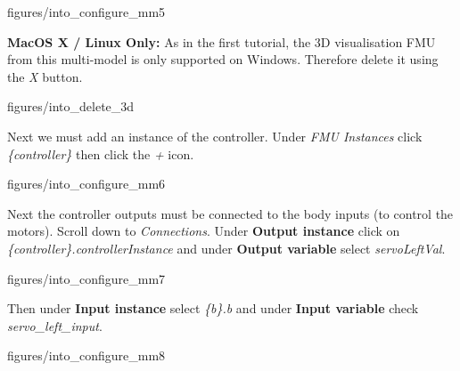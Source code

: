 \documentclass[11pt,a4paper]{../tutorial}
\begin{document}
\begin{instructions}
    \begin{annotation}[width=0.8\linewidth]{figures/into_configure_mm5}
    \end{annotation}

\item \textbf{MacOS X / Linux Only:} As in the first tutorial, the 3D visualisation FMU from this multi-model is only supported on Windows. Therefore delete it using the \emph{X} button.

    \begin{annotation}[width=0.8\linewidth,trim=0 0 0 0,clip]{figures/into_delete_3d}
    \end{annotation}

\newpage
\item Next we must add an instance of the controller. Under \emph{FMU Instances} click \emph{\{controller\}} then click the \emph{+} icon.

    \begin{annotation}[width=0.8\linewidth]{figures/into_configure_mm6}
    \end{annotation}

\item Next the controller outputs must be connected to the body inputs (to control the motors). Scroll down to \emph{Connections}. Under \textbf{Output instance} click on \emph{\{controller\}.controllerInstance} and under \textbf{Output variable} select \emph{servoLeftVal}.

    \begin{annotation}[width=0.8\linewidth,trim=0 0 0 100,clip]{figures/into_configure_mm7}
    \end{annotation}

\item Then under \textbf{Input instance} select \emph{\{b\}.b} and under \textbf{Input variable} check \emph{servo\_left\_input}.

    \begin{annotation}[width=0.8\linewidth,trim=0 70 0 0,clip]{figures/into_configure_mm8}
    \end{annotation}


\end{instructions}
\end{document}

